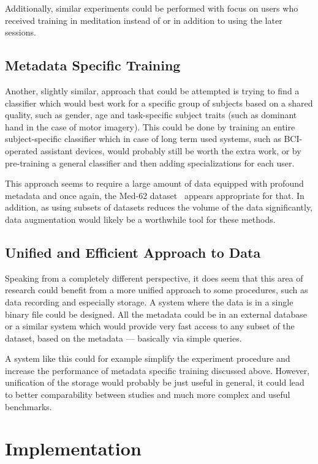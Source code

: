 \documentclass[english, he, bc, kiv, iso690alph]{fasthesis}
\begin{document}
Additionally, similar experiments could be performed with focus on users who received training in meditation instead of or in addition to using the later sessions.

\section{Metadata Specific Training}
\label{sec:metadata:specific}

Another, slightly similar, approach that could be attempted is trying to find a classifier which would best work for a specific group of subjects based on a shared quality, such as gender, age and task-specific subject traits (such as dominant hand in the case of motor imagery). This could be done by training an entire subject-specific classifier which in case of long term used systems, such as BCI-operated assistant devices, would probably still be worth the extra work, or by pre-training a general classifier and then adding specializations for each user.

This approach seems to require a large amount of data equipped with profound metadata and once again, the Med-62 dataset~\cite{data:stieger:21} appears appropriate for that. In addition, as using subsets of datasets reduces the volume of the data significantly, data augmentation would likely be a worthwhile tool for these methods.

\section{Unified and Efficient Approach to Data}

Speaking from a completely different perspective, it does seem that this area of research could benefit from a more unified approach to some procedures, such as data recording and especially storage. A system where the data is in a single binary file could be designed. All the metadata could be in an external database or a similar system which would provide very fast access to any subset of the dataset, based on the metadata --- basically via simple queries.

A system like this could for example simplify the experiment procedure and increase the performance of metadata specific training discussed above. However, unification of the storage would probably be just useful in general, it could lead to better comparability between studies and much more complex and useful benchmarks.

\chapter{Implementation}
\end{document}
